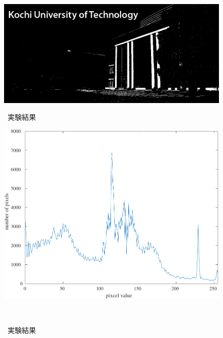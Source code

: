 \begin{figure}[h]
\begin{minipage}[b]{.7\textwidth}
\begin{minipage}[b]{.3\textwidth}
        \end{minipage}
        \begin{minipage}[b]{.3\textwidth}
            \centering
            \includegraphics[keepaspectratio,width=\textwidth]{../../Figures/05_43.png}
        \end{minipage}
        \caption{\kadaiad\ 実験結果}
    \end{minipage}
    \begin{minipage}[b]{.25\textwidth}
        \centering
        \includegraphics[keepaspectratio,width=\textwidth]{../../Figures/05_50_graph.pdf}
        \caption{\kadaiae\ 実験結果}
    \end{minipage}
    \nextfloat
    \\\vsp
    \begin{minipage}[b]{.49\textwidth}
        \centering
        \begin{minipage}[b]{.3\textwidth}
            \centering

\end{minipage}
\end{minipage}
\end{figure}
